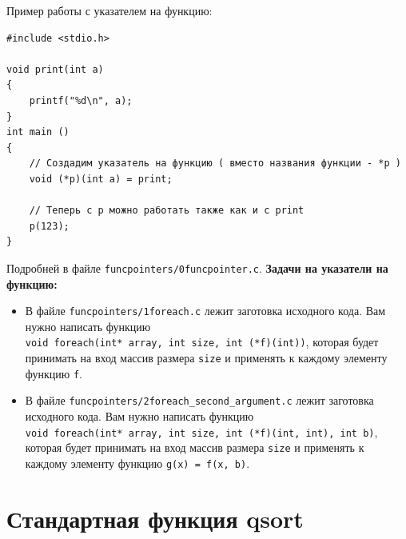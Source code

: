 \documentclass{article}
\begin{document}
Пример работы с указателем на функцию:
\begin{lstlisting}
#include <stdio.h>

void print(int a)
{
    printf("%d\n", a);
}
int main ()
{
    // Создадим указатель на функцию ( вместо названия функции - *p )
    void (*p)(int a) = print;
    
    // Теперь с p можно работать также как и с print
    p(123);
}
\end{lstlisting}
Подробней в файле \texttt{funcpointers/0funcpointer.c}.
\newpage
\textbf{Задачи на указатели на функцию:}
\begin{itemize}
\item В файле \texttt{funcpointers/1foreach.c} лежит заготовка исходного кода. Вам нужно написать функцию\\ \texttt{void foreach(int* array, int size, int (*f)(int))}, которая будет принимать на вход массив размера \texttt{size} и применять к каждому элементу функцию \texttt{f}.

\item В файле \texttt{funcpointers/2foreach\_second\_argument.c} лежит заготовка исходного кода. Вам нужно написать функцию\\ \texttt{void foreach(int* array, int size, int (*f)(int, int), int b)}, которая будет принимать на вход массив размера \texttt{size} и применять к каждому элементу функцию \texttt{g(x) = f(x, b)}.
\end{itemize}


\section*{Стандартная функция qsort}
\end{document}
